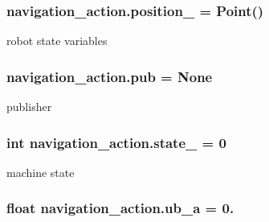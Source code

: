 \subsubsection[{\texorpdfstring{position\+\_\+}{position_}}]{\setlength{\rightskip}{0pt plus 5cm}navigation\+\_\+action.\+position\+\_\+ = Point()}\hypertarget{namespacenavigation__action_aa53bb3e42cba75b4faece7677fdf8b1d}{}\label{namespacenavigation__action_aa53bb3e42cba75b4faece7677fdf8b1d}


robot state variables 

\subsubsection[{\texorpdfstring{pub}{pub}}]{\setlength{\rightskip}{0pt plus 5cm}navigation\+\_\+action.\+pub = None}\hypertarget{namespacenavigation__action_a534f03fffb29fa18e1e2f01c2e99ac90}{}\label{namespacenavigation__action_a534f03fffb29fa18e1e2f01c2e99ac90}


publisher 

\subsubsection[{\texorpdfstring{state\+\_\+}{state_}}]{\setlength{\rightskip}{0pt plus 5cm}int navigation\+\_\+action.\+state\+\_\+ = 0}\hypertarget{namespacenavigation__action_ac6656a4827fb720e3c7a7224940626d2}{}\label{namespacenavigation__action_ac6656a4827fb720e3c7a7224940626d2}


machine state 

\subsubsection[{\texorpdfstring{ub\+\_\+a}{ub_a}}]{\setlength{\rightskip}{0pt plus 5cm}float navigation\+\_\+action.\+ub\+\_\+a = 0.}\hypertarget{namespacenavigation__action_a2949c425c74dfbe48d976545b4f4db9d}{}\label{namespacenavigation__action_a2949c425c74dfbe48d976545b4f4db9d}
